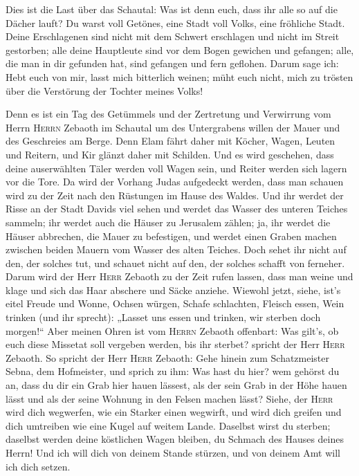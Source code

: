 Dies ist die Last über das Schautal: Was ist denn euch,
dass ihr alle so auf die Dächer lauft?  Du warst voll
Getönes, eine Stadt voll Volks, eine fröhliche Stadt. Deine Erschlagenen
sind nicht mit dem Schwert erschlagen und nicht im Streit gestorben;
 alle deine Hauptleute sind vor dem Bogen gewichen und
gefangen; alle, die man in dir gefunden hat, sind gefangen und fern
geflohen.  Darum sage ich: Hebt euch von mir, lasst mich
bitterlich weinen; müht euch nicht, mich zu trösten über die Verstörung
der Tochter meines Volks!

 Denn es ist ein Tag des Getümmels und der Zertretung und
Verwirrung vom Herrn \textsc{Herrn} Zebaoth im Schautal um des
Untergrabens willen der Mauer und des Geschreies am Berge.
 Denn Elam fährt daher mit Köcher, Wagen, Leuten und
Reitern, und Kir glänzt daher mit Schilden.  Und es wird
geschehen, dass deine auserwählten Täler werden voll Wagen sein, und
Reiter werden sich lagern vor die Tore.  Da wird der
Vorhang Judas aufgedeckt werden, dass man schauen wird zu der Zeit nach
den Rüstungen im Hause des Waldes.  Und ihr werdet der
Risse an der Stadt Davids viel sehen und werdet das Wasser des unteren
Teiches sammeln;  ihr werdet auch die Häuser zu Jerusalem
zählen; ja, ihr werdet die Häuser abbrechen, die Mauer zu befestigen,
 und werdet einen Graben machen zwischen beiden Mauern
vom Wasser des alten Teiches. Doch sehet ihr nicht auf den, der solches
tut, und schauet nicht auf den, der solches schafft von ferneher.
 Darum wird der Herr \textsc{Herr} Zebaoth zu der Zeit
rufen lassen, dass man weine und klage und sich das Haar abschere und
Säcke anziehe.  Wiewohl jetzt, siehe, ist's eitel Freude
und Wonne, Ochsen würgen, Schafe schlachten, Fleisch essen, Wein trinken
(und ihr sprecht): „Lasset uns essen und trinken, wir sterben doch
morgen!{}``  Aber meinen Ohren ist vom \textsc{Herrn}
Zebaoth offenbart: Was gilt's, ob euch diese Missetat soll vergeben
werden, bis ihr sterbet? spricht der Herr \textsc{Herr} Zebaoth.
 So spricht der Herr \textsc{Herr} Zebaoth: Gehe hinein
zum Schatzmeister Sebna, dem Hofmeister, und sprich zu ihm:
 Was hast du hier? wem gehörst du an, dass du dir ein
Grab hier hauen lässest, als der sein Grab in der Höhe hauen lässt und
als der seine Wohnung in den Felsen machen lässt?  Siehe,
der \textsc{Herr} wird dich wegwerfen, wie ein Starker einen wegwirft,
und wird dich greifen  und dich umtreiben wie eine Kugel
auf weitem Lande. Daselbst wirst du sterben; daselbst werden deine
köstlichen Wagen bleiben, du Schmach des Hauses deines Herrn!
 Und ich will dich von deinem Stande stürzen, und von
deinem Amt will ich dich setzen.

